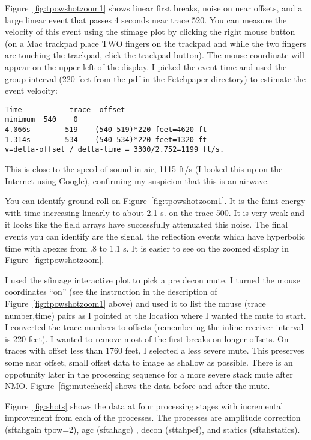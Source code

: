 Figure~\ref{fig:tpowshotzoom1} shows linear first breaks, noise on near offsets, and a large linear event that passes 4 seconds near trace 520.  You can measure the velocity of this event using the sfimage plot by clicking the right mouse button (on a Mac trackpad place TWO fingers on the trackpad and while the two fingers are touching the trackpad, click the trackpad button).  The mouse coordinate will appear on the upper left of the display.  I picked the event time and used the group interval (220 feet from the pdf in the Fetchpaper directory) to estimate the event velocity:

\begin{verbatim}  
Time           trace  offset
minimum  540    0
4.066s        519    (540-519)*220 feet=4620 ft
1.314s        534    (540-534)*220 feet=1320 ft
v=delta-offset / delta-time = 3300/2.752=1199 ft/s.
\end{verbatim}  

This is close to the speed of sound in air, 1115 ft/s (I looked this up on the Internet using Google), confirming my suspicion that this is an airwave.   

You can identify ground roll on Figure~\ref{fig:tpowshotzoom1}.  It is the faint energy with time increasing linearly to about 2.1 s. on the trace 500.  It is very weak and it looks like the field arrays have successfully attenuated this noise.  The final events you can identify are the signal, the reflection events which have hyperbolic time with apexes from .8 to 1.1 s.  It is easier to see on the zoomed display in Figure~\ref{fig:tpowshotzoom}.

I used the sfimage interactive plot to pick a pre decon mute.  I turned the mouse coordinates “on” (see the instruction in the description of Figure~\ref{fig:tpowshotzoom1} above) and used it to list the mouse (trace number,time) pairs as I pointed at the location where I wanted the mute to start.  I converted the trace numbers to offsets (remembering the inline receiver interval is 220 feet).  I wanted to remove most of the first breaks on longer offsets.  On traces with offset less than 1760 feet, I selected a less severe mute.  This preserves some near offset, small offset data to image as shallow as possible.  There is an oppotunity later in the processing sequence for a more severe stack mute after NMO.  Figure~\ref{fig:mutecheck} shows the data before and after the mute.

Figure~\ref{fig:shots} shows the data at four processing stages with incremental improvement from each of the processes.  The processes are amplitude correction (sftahgain tpow=2), agc (sftahagc) , decon (sttahpef), and statics (sftahstatics).

